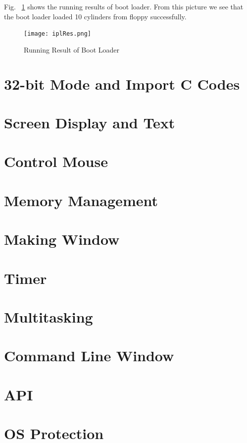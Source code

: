 \documentclass{swfcthesisp}
\begin{document}
Fig. ~\ref{fig:iplRes} shows the running results of boot loader. From this picture we
see that the boot loader loaded 10 cylinders from floppy successfully. 
\begin{figure}[!ht]
  \centering
  \texttt{[image: iplRes.png]}
  \caption{Running Result of Boot Loader}
  \label{fig:iplRes}
\end{figure}



\section{32-bit Mode and Import C Codes}


\section{Screen Display and Text}

\section{Control Mouse}


\section{Memory Management}

\section{Making Window }

\section{Timer}

\section{Multitasking}

\section{Command Line Window}

\section{API}

\section{OS Protection}
\end{document}
